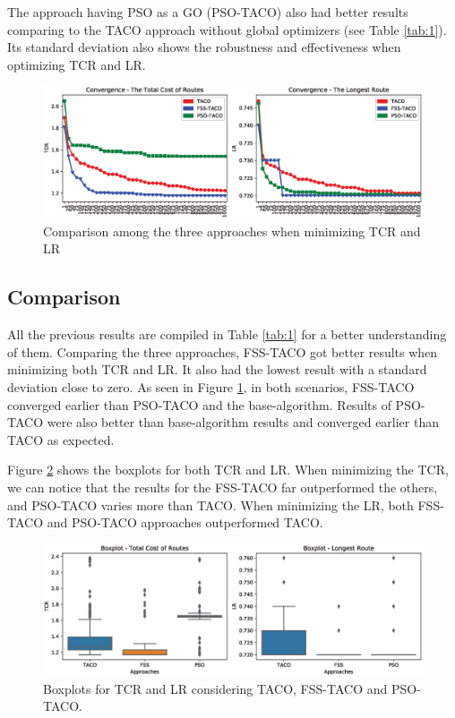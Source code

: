 \documentclass[runningheads]{llncs}
\begin{document}
The approach having PSO as a GO (PSO-TACO) also had better results comparing to the TACO approach without global optimizers (see Table \ref{tab:1}). Its standard deviation also shows the robustness and effectiveness when optimizing TCR and LR.
\begin{figure}
    \centering
    \includegraphics[width=\textwidth]{convergence-unique.eps}
    \caption{Comparison among the three approaches when minimizing TCR and LR} \label{fig:3}
\end{figure}

\subsection{Comparison}
All the previous results are compiled in Table \ref{tab:1} for a better understanding of them. Comparing the three approaches, FSS-TACO got better results when minimizing both TCR and LR. It also had the lowest result with a standard deviation close to zero. As seen in Figure \ref{fig:3}, in both scenarios, FSS-TACO converged earlier than PSO-TACO and the base-algorithm. Results of PSO-TACO were also better than base-algorithm results and converged earlier than TACO as expected. 

Figure \ref{fig:4} shows the boxplots for both TCR and LR. When minimizing the TCR, we can notice that the results for the FSS-TACO far outperformed the others, and PSO-TACO varies more than TACO. When minimizing the LR, both FSS-TACO and PSO-TACO approaches outperformed TACO.
\begin{figure}
    \centering
    \includegraphics[width=\textwidth]{boxplot-unique.eps}
    \caption{Boxplots for TCR and LR considering TACO, FSS-TACO and PSO-TACO.} \label{fig:4}
\end{figure}
\end{document}
